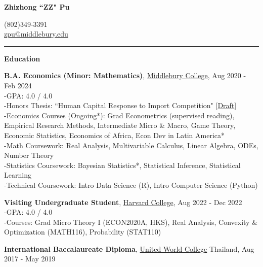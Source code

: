 \documentclass{article}
\begin{document}
{\Large \textbf{Zhizhong ``ZZ" Pu}\par}
    (802)349-3391 \\
    \href{mailto:zpu@middlebury.edu}{zpu@middlebury.edu} \href{https://github.com/zhizhongpu}{\faGithub} \hspace{0.2em} \\
    
    \vspace{-0.2in}
    \rule{\textwidth}{1pt}
    \vspace{-0.1in}


{\Large \textbf{Education}}\\
    \vspace{-0.15in}
	\begin{adjustwidth}{1.5em}{0pt}
        \textbf{B.A. Economics (Minor: Mathematics)}, \href{http://www.middlebury.edu/}{Middlebury College}, Aug 2020 - Feb 2024 \\
        \hspace*{2mm} -GPA: 4.0 / 4.0 \\
        \hspace*{2mm} -Honors Thesis: ``Human Capital Response to Import Competition" [\href{https://drive.google.com/file/d/1yteFvceB-RpjYpTysCTVnTBOr9mdy6v_/view?usp=sharing}{Draft}]\\
        \hspace*{2mm} -Economics Courses (Ongoing*): Grad Econometrics (supervised reading), Empirical Research Methods, Intermediate Micro \& Macro, Game Theory, Economic Statistics, Economics of Africa, Econ Dev in Latin America* \\
        \hspace*{2mm} -Math Coursework: Real Analysis, Multivariable Calculus, Linear Algebra, ODEs, Number Theory \\
        \hspace*{2mm} -Statistics Coursework: Bayesian Statistics*, Statistical Inference, Statistical Learning \\
        \hspace*{2mm} -Technical Coursework: Intro Data Science (R), Intro Computer Science (Python)
        \vspace{2mm}

        \textbf{Visiting Undergraduate Student}, \href{http://www.harvard.edu/}{Harvard College}, Aug 2022 - Dec 2022 \\
        \hspace*{2mm} -GPA: 4.0 / 4.0 \\
        \hspace*{2mm} -Courses: Grad Micro Theory I (ECON2020A, HKS), Real Analysis, Convexity \& Optimization (MATH116), Probability (STAT110)
        \vspace{2mm}

        \textbf{International Baccalaureate Diploma}, \href{https://www.uwc.org/about}{United World College} Thailand, Aug 2017 - May 2019
        
    \end{adjustwidth}
    \vspace{0.2in}
\end{document}
